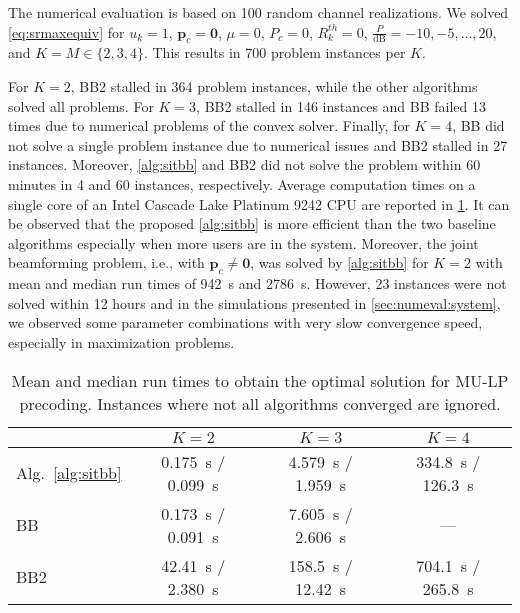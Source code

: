 \documentclass[a4paper,10pt,journal]{IEEEtran}
\let\vec\bm
\begin{document}
The numerical evaluation is based on 100 random  channel realizations. We solved \cref{eq:srmaxequiv} for $u_k = 1$, $\vec p_c = \vec 0$, $\mu = 0$, $P_c = 0$, $R_{k}^{th} = 0$, $\frac{P}{\mathrm{dB}} = -10, -5, \dots, 20$, and $K = M \in \{ 2, 3, 4 \}$. This results in 700 problem instances per $K$.

For $K = 2$, BB2 stalled in 364 problem instances, while the other algorithms solved all problems. For $K = 3$, BB2 stalled in 146 instances and BB failed 13 times due to numerical problems of the convex solver. Finally, for $K = 4$, BB did not solve a single problem instance due to numerical issues and BB2 stalled in 27 instances. Moreover, \cref{alg:sitbb} and BB2 did not solve the problem within 60 minutes in 4 and 60 instances, respectively. Average computation times on a single core of an Intel Cascade Lake Platinum 9242 CPU are reported in \cref{tab}. It can be observed that the proposed \cref{alg:sitbb} is more efficient than the two baseline algorithms especially when more users are in the system.
Moreover, the joint beamforming problem, i.e., with $\vec p_c \neq \vec 0$, was solved by \cref{alg:sitbb} for $K = 2$ with mean and median run times of \SI{942}{\second} and \SI{2786}{\second}. However, 23 instances were not solved within 12 hours and in the simulations presented in \cref{sec:numeval:system}, we observed some parameter combinations with very slow convergence speed, especially in  maximization problems.



\begin{table}[tb]
	\caption{Mean and median run times to obtain the optimal solution for MU-LP precoding. Instances where not all algorithms converged are ignored.}
	\label{tab}
	\centering
	\footnotesize
	\begin{tabular}{lccc}
		\toprule
		 & $K = 2$ & $K = 3$ & $K = 4$\\
		 \midrule
		 Alg.~\ref{alg:sitbb} & \SI{0.175}{\second} / \SI{0.099}{\second} & \SI{4.579}{\second} / \SI{1.959}{\second} & \SI{334.8}{\second} / \SI{126.3}{\second} \\
		 BB  & \SI{0.173}{\second} / \SI{0.091}{\second} & \SI{7.605}{\second} / \SI{2.606}{\second} & --- \\
		 BB2 & \SI{42.41}{\second} / \SI{2.380}{\second} & \SI{158.5}{\second} / \SI{12.42}{\second} & \SI{704.1}{\second} / \SI{265.8}{\second}\\
		\bottomrule
	\end{tabular}
\end{table}
\end{document}
